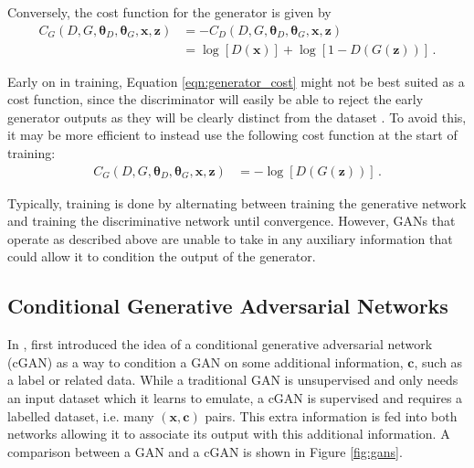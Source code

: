 \documentclass[11pt,a4paper,onecolumn]{report}
\begin{document}
\noindent Conversely, the cost function for the generator is given by
\begin{align}
  C_G(D, G, \bm{\theta}_D, \bm{\theta}_G, \bm{x}, \bm{z})
  &= -C_D(D, G, \bm{\theta}_D, \bm{\theta}_G, \bm{x}, \bm{z})\\
  &= \log[D(\bm{x})] + \log[1 - D(G(\bm{z}))] \,.
  \label{eqn:generator_cost}
\end{align}

Early on in training, Equation \ref{eqn:generator_cost} might not be best suited
as a cost function, since the discriminator will easily be able to reject the
early generator outputs as they will be clearly distinct from the dataset
\citep{Goodfellow2014}. To avoid this, it may be more efficient to instead use
the following cost function at the start of training:
\begin{align}
  C_G(D, G, \bm{\theta}_D, \bm{\theta}_G, \bm{x}, \bm{z})
  &= -\log[D(G(\bm{z}))]\,.
\end{align}

Typically, training is done by alternating between training the generative network
and training the discriminative network until convergence. However, GANs that
operate as described above are unable to take in any auxiliary information that
could allow it to condition the output of the generator.

\subsection{Conditional Generative Adversarial Networks}
\label{sec:cgan}
In \citeyear{mirza_conditional_2014}, \citeauthor{mirza_conditional_2014} first
introduced the idea of a conditional generative adversarial network (cGAN) as a
way to condition a GAN on some additional information, \(\bm{c}\), such as a
label or related data. While a traditional GAN is unsupervised and only needs an
input dataset which it learns to emulate, a cGAN is supervised and requires a
labelled dataset, i.e. many \((\bm{x}, \bm{c})\) pairs. This extra information
is fed into both networks allowing it to associate its output with this
additional information. A comparison between a GAN
and a cGAN is shown in Figure \ref{fig:gans}.\\
\end{document}
